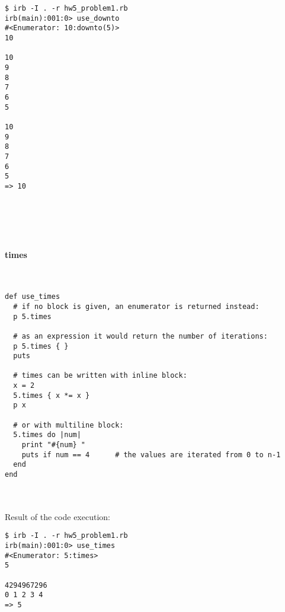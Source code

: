 \documentclass{article}
\begin{document}
\begin{verbatim} 
$ irb -I . -r hw5_problem1.rb
irb(main):001:0> use_downto
#<Enumerator: 10:downto(5)>
10

10
9
8
7
6
5

10
9
8
7
6
5
=> 10
\end{verbatim}

\paragraph{}\
\paragraph{}\



\paragraph{ times}\

\begin{verbatim}
def use_times
  # if no block is given, an enumerator is returned instead:
  p 5.times

  # as an expression it would return the number of iterations:
  p 5.times { }
  puts

  # times can be written with inline block:
  x = 2
  5.times { x *= x }
  p x

  # or with multiline block:
  5.times do |num|
    print "#{num} "
    puts if num == 4      # the values are iterated from 0 to n-1
  end
end
\end{verbatim}


\paragraph{}\

Result of the code execution:

\begin{verbatim} 
$ irb -I . -r hw5_problem1.rb
irb(main):001:0> use_times
#<Enumerator: 5:times>
5

4294967296
0 1 2 3 4
=> 5
\end{verbatim}


\paragraph{}\
\paragraph{}\
\end{document}
